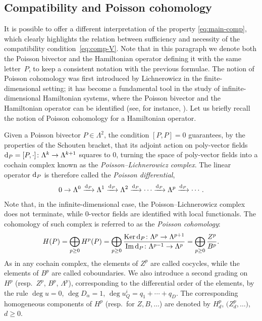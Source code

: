 \documentclass[10pt,a4paper]{amsart}
\numberwithin{equation}{section}
\begin{document}
\subsection{Compatibility and Poisson cohomology}\label{sec:Pois}
It is possible to offer a different interpretation of the property \eqref{eq:main-comp}, which clearly highlights the relation between sufficiency and necessity of the compatibility condition~\eqref{eq:comp-V}. Note that in this paragraph we denote both the Poisson bivector and the Hamiltonian operator defining it with the same letter~$P$, to keep a consistent notation with the previous formulae. The notion of Poisson cohomology was first introduced by Lichnerowicz \cite{lichnerowicz1977varietes} in the finite-dimensional setting; it has become a fundamental tool in the study of infinite-dimensional Hamiltonian systems, where the Poisson bivector and the Hamiltonian operator can be identified (see, for instance, \cite{dubrovin2001normal,getzler}). Let us briefly recall the notion of Poisson cohomology for a Hamiltonian operator.

Given a Poisson bivector $P\in\Lambda^2$, the condition $[P,P]=0$ guarantees, by the properties of the Schouten bracket, that its adjoint action on poly-vector fields ${\rm d}_P=[P,\cdot]\colon\Lambda^k\to\Lambda^{k+1}$ squares to 0, turning the space of poly-vector fields into a cochain complex known as the \emph{Poisson--Lichnerowicz complex}. The linear operator ${\rm d}_P$ is therefore called the \emph{Poisson differential},
\begin{gather*}
0\to\Lambda^0\xrightarrow{{\rm d}_P}\Lambda^1\xrightarrow{{\rm d}_P}\Lambda^2\xrightarrow{{\rm d}_P}\cdots\xrightarrow{{\rm d}_P}\Lambda^p\xrightarrow{{\rm d}_P}\cdots.
\end{gather*}
Note that, in the infinite-dimensional case, the Poisson--Lichnerowicz complex does not terminate, while $0$-vector fields are identified with local functionals. The cohomology of such complex is referred to as the \emph{Poisson cohomology}:
\begin{gather*}
H(P)=\bigoplus\limits_{p\geq 0}H^p(P)=\bigoplus\limits_{p\geq 0}\frac{\operatorname{Ker}{\rm d}_P\colon\Lambda^p\to\Lambda^{p+1}}{\operatorname{Im} {\rm d}_P\colon\Lambda^{p-1}\to\Lambda^p}=\bigoplus\limits_{p\geq 0}\frac{Z^p}{B^p}.
\end{gather*}
As in any cochain complex, the elements of $Z^p$ are called cocycles, while the elements of $B^p$ are called coboundaries. We also introduce a second grading on $H^p$ (resp.\ $Z^p$, $B^p$, $\Lambda^p$), corresponding to the differential order of the elements, by the rule $\deg u=0$, $\deg D_\alpha=1$, $\deg u^i_Q=q_1+\cdots+q_D$. The corresponding homogeneous components of $H^p$ (resp.\ for $Z,B,\ldots$) are denoted by $H^p_d$, $\big(Z^p_d,\ldots\big)$, $d\geq 0$.
\end{document}
